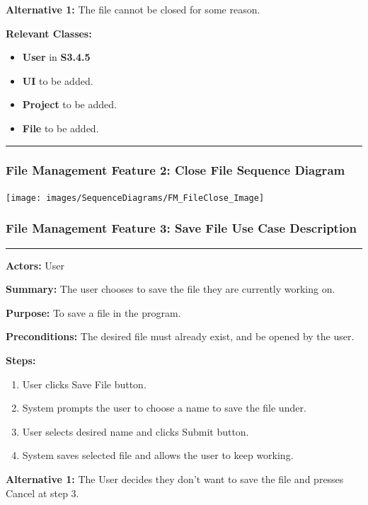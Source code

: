 \documentclass[twoside,letterpaper]{article}
\begin{document}
\noindent\textbf{Alternative 1:} The file cannot be closed for some reason. \newline

\noindent\textbf{Relevant Classes:}
\begin{itemize}
	\item \textbf{User} in \textbf{S3.4.5}
	\item \textbf{UI} to be added.
	\item \textbf{Project} to be added.
	\item \textbf{File} to be added.
\end{itemize}
\vspace{8pt}
\hrule

\newpage

\subsubsection[File Management Feature 2: Close File Sequence Diagram]{\rmfamily\bfseries\color{black}
	File Management Feature 2: Close File Sequence Diagram}
\hypertarget{RefHeading22059017292}{}

\texttt{[image: images/SequenceDiagrams/FM\_FileClose\_Image]}

\newpage

\subsubsection[File Management Feature 3: Save File Use Case Description]{\rmfamily\bfseries\color{black}
	File Management Feature 3: Save File Use Case Description}
\hypertarget{RefHeading22059017292}{}

\vspace{2pt}
\hrule
\vspace{8pt}
\textbf{Actors:} User \newline

\noindent\textbf{Summary:} The user chooses to save the file they are currently working on. \newline

\noindent\textbf{Purpose:} To save a file in the program. \newline

\noindent\textbf{Preconditions:} The desired file must already exist, and be opened by the user. \newline

\noindent\textbf{Steps:} \begin{enumerate}
	\item User clicks Save File button.
	\item System prompts the user to choose a name to save the file under.
	\item User selects desired name and clicks Submit button.
	\item System saves selected file and allows the user to keep working.

\end{enumerate}
\noindent\textbf{Alternative 1:} The User decides they don't want to save the file and presses Cancel at step 3. \newline
\end{document}
